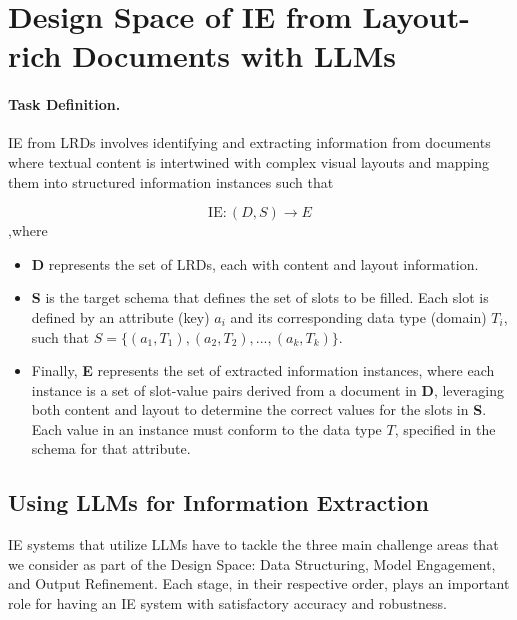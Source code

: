 \section{Design Space of IE from Layout-rich Documents with LLMs}
\label{sec:design_space_IE}

\paragraph{Task Definition.}IE from LRDs involves identifying and extracting information from documents where textual content is intertwined with complex visual layouts and mapping them into structured information instances such that

\begin{equation}
\text{IE}: (D, S) \rightarrow E
\end{equation}
,where
\begin{itemize}[leftmargin=*,noitemsep,topsep=0pt]
    \item \textbf{D} represents the set of LRDs, each with content and layout information.
    \item \textbf{S} is the target schema that defines the set of slots to be filled.
    Each slot is defined by an attribute (key) $a_i$ and its corresponding data type (domain) $T_i$, such that $S = \{(a_1, T_1), (a_2, T_2), ..., (a_k, T_k)\}$.
    
    \item Finally, \textbf{E} represents the set of extracted information instances, where each instance is a set of slot-value pairs derived from a document in \textbf{D}, leveraging both content and layout to determine the correct values for the slots in \textbf{S}. Each value in an instance must conform to the data type $T$, specified in the schema for that attribute.
    
\end{itemize}

\subsection{Using LLMs for Information Extraction}
IE systems that utilize LLMs have to tackle the three main challenge areas that we consider as part of the Design Space: Data Structuring, Model Engagement, and Output Refinement. Each stage, in their respective order, plays an important role for having an IE system with satisfactory accuracy and robustness.

